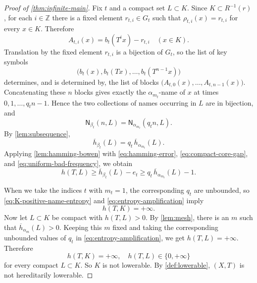 \documentclass[10pt,a4paper]{amsart}
\newcommand{\Z}{\mathbb Z}
\newcommand{\Nname}{\mathsf N}
\numberwithin{equation}{section}
\begin{document}
\begin{proof}[Proof of \cref{thm:infinite-main}]
		
		Fix
		$t$ and a compact set $L\subset K$.  Since $K\subset R^{-1}(r)$, for each
		$i\in\Z$ there is a fixed element $r_{t,i}\in G_t$ such that
		$\rho_{t,i}(x)=r_{t,i}$ for every $x\in K$.  Therefore
		\[
		A_{t,i}(x)=b_t(T^ix)-r_{t,i}
		\quad(x\in K).
		\]
		Translation by the fixed element $r_{t,i}$ is a bijection of $G_t$, so the
		list of key symbols
		\[
		\bigl(b_t(x),b_t(Tx),\ldots,b_t(T^{n-1}x)\bigr)
		\]
		determines, and is determined by, the list of blocks
		$\bigl(A_{t,0}(x),\ldots,A_{t,n-1}(x)\bigr)$.  Concatenating these $n$
		blocks gives exactly the $\alpha_{m_t}$-name of $x$ at times
		$0,1,\ldots,q_tn-1$.  Hence the two collections of names occurring in
		$L$ are in bijection, and
		\begin{equation}
			\Nname_{\beta_t}(n,L)
			=
			\Nname_{\alpha_{m_t}}(q_tn,L).
			\label{eq:exact-name-count}
		\end{equation}
		By \cref{lem:subsequence},
		\begin{equation}
			\overline h_{\beta_t}(L)
			=
			q_t\,\overline h_{\alpha_{m_t}}(L).
			\label{eq:block-entropy-scaling}
		\end{equation}
		Applying \cref{lem:hamming-bowen} with
		\eqref{eq:hamming-error}, \eqref{eq:compact-core-gap}, and
		\eqref{eq:uniform-bad-frequency}, we obtain
		\begin{equation}
			h(T,L)
			\geq
			\overline h_{\beta_t}(L)-e_t
			\geq
			q_t\,\overline h_{\alpha_{m_t}}(L)-1.
			\label{eq:entropy-amplification}
		\end{equation}
		
		When we take the indices $t$ with $m_t=1$, the corresponding $q_t$ are unbounded, so
		\eqref{eq:K-positive-name-entropy} and
		\eqref{eq:entropy-amplification} imply
		\begin{equation}
			h(T,K)=+\infty.
			\label{eq:K-infinite}
		\end{equation}
		Now let $L\subset K$ be compact with $h(T,L)>0$. By \cref{lem:mesh}, there
		is an $m$ such that $\overline h_{\alpha_m}(L)>0$. Keeping this $m$ fixed
		and taking the corresponding unbounded values of $q_t$ in
		\eqref{eq:entropy-amplification}, we get $h(T,L)=+\infty$. Therefore
		\[
		h(T,K)=+\infty,
		\quad 
		h(T,L)\in\{0,+\infty\}
		\]
		for every compact $L\subset K$. So $K$ is not lowerable. By
		\cref{def:lowerable}, $(X,T)$ is not hereditarily lowerable.
	\end{proof}
		
\end{document}
